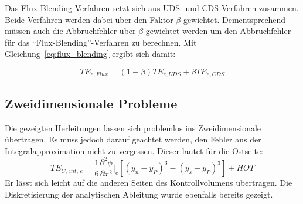 Das Flux-Blending-Verfahren setzt sich aus UDS- und CDS-Verfahren zusammen. Beide
Verfahren werden dabei über den Faktor $\beta$ gewichtet. Dementsprechend müssen auch die
Abbruchfehler über $\beta$ gewichtet werden um den Abbruchfehler für das ``Flux-Blending''-Verfahren zu berechnen.
Mit Gleichung~\ref{eq:flux_blending} ergibt sich damit:

\begin{equation}
  TE_{e, Flux} = (1-\beta) TE_{e, UDS} + \beta TE_{e, CDS}
\end{equation}







\subsection{Zweidimensionale Probleme}
Die gezeigten Herleitungen lassen sich problemlos ins Zweidimensionale übertragen. Es muss
jedoch darauf geachtet werden, den Fehler aus der Integralapproximation nicht zu vergessen.
Dieser lautet für die Ostseite:
\begin{equation}
  TE_{C,\,int,\,e} = \frac{1}{6} \frac{\partial^2\phi}{\partial x^2}\bigg\vert_e
    \left[{{(y_n-y_P)}^3-{(y_s-y_P)}^3}\right] + HOT
\end{equation}
Er lässt sich leicht auf die anderen Seiten des Kontrollvolumens übertragen. Die Diskretisierung
der analytischen Ableitung wurde ebenfalls bereits gezeigt.
\clearpage
